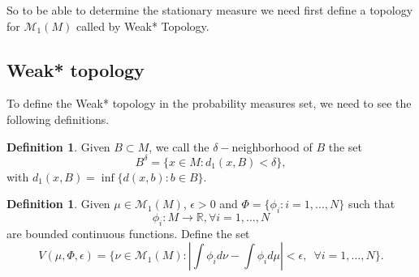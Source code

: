 \documentclass[a4paper]{article}
\theoremstyle{plain}
\theoremstyle{definition}
\newtheorem{defn}[theorem]{Definition}%
\begin{document}
So to be able to determine the stationary measure we need first define a topology for $\mathcal{M}_1(M)$ called by Weak* Topology. 

\subsection{Weak* topology}
    To define the Weak* topology in the probability measures set, we need to see the following definitions.

    \begin{defn}
        Given $B \subset M$, we call the $\delta-$neighborhood of $B$ the set 
        $$ B^{\delta} = \{x \in M: d_1(x,B) < \delta\},$$
    with $d_1(x,B) = \inf\{d(x,b): b \in B\}$.
    \end{defn}

    \begin{defn}
        Given $\mu \in \mathcal{M}_1(M)$, $\epsilon>0$ and $\Phi = \{\phi_i: i=1,\dots,N\}$ such that 
        $$ \phi_i: M \to \mathbb{R}, \forall i=1,\dots,N$$
    are bounded continuous functions. Define the set 
    $$ V(\mu,\Phi,\epsilon) =\{ \nu \in \mathcal{M}_1(M): \left|\int \phi_i d\nu - \int \phi_i d\mu \right| < \epsilon, \,\,\, \forall i=1,\dots,N\}.$$
    \end{defn}
\end{document}
